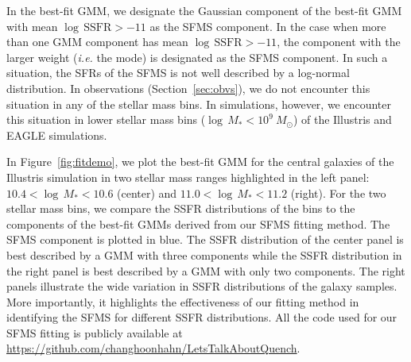 \documentclass[preprint2,tighten]{aastex62}
\begin{document}
In the best-fit GMM, we designate the Gaussian component of the 
best-fit GMM with mean $\log\,\mathrm{SSFR} > −11$ as the SFMS component.
In the case when more than one GMM component has mean 
$\log\,\mathrm{SSFR} > −11$, the component with the larger weight 
(\emph{i.e.} the mode) is designated as the SFMS component. In such a 
situation, the SFRs of the SFMS is not well described by a log-normal
distribution. In observations (Section~\ref{sec:obvs}), we do not 
encounter this situation in any of the stellar mass bins. In simulations, 
however, we encounter this situation in lower stellar mass bins 
($\log\,M_* < 10^{9}\ M_\odot$) of the Illustris and EAGLE simulations. 

In Figure~\ref{fig:fitdemo}, we plot the best-fit GMM for the 
central galaxies of the Illustris simulation in two stellar mass 
ranges highlighted in the left panel: $10.4 < \log\,M_* < 10.6$ (center) 
and $11.0 < \log\,M_* < 11.2$ (right). For the two stellar mass bins, 
we compare the SSFR distributions of the bins to the components of the 
best-fit GMMs derived from our SFMS fitting method. The SFMS component 
is plotted in blue. The SSFR distribution of the center panel is best 
described by a GMM with three components while the SSFR distribution 
in the right  panel is best described by a GMM with only two components.
The right panels illustrate the wide variation in SSFR distributions of 
the galaxy samples. More importantly, it highlights the effectiveness 
of our fitting method in identifying the SFMS for different SSFR 
distributions. All the code used for our SFMS fitting is publicly available 
at \url{https://github.com/changhoonhahn/LetsTalkAboutQuench}.
\end{document}
